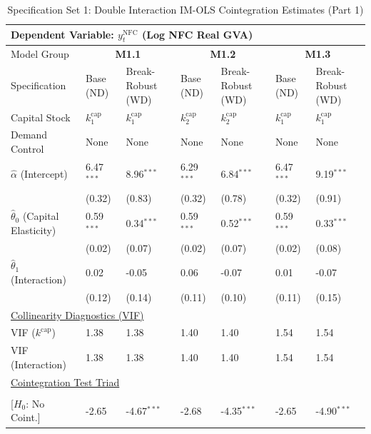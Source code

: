 \begin{table}[H]
\centering
\caption{Specification Set 1: Double Interaction IM-OLS Cointegration Estimates (Part 1)}
\label{tab:spec_set_1_p1}
\scriptsize
\begin{tabular}{p{3.8cm}p{2.1cm}p{2.1cm}p{2.1cm}p{2.1cm}p{2.1cm}p{2.1cm}}
\toprule
\multicolumn{7}{l}{\textbf{Dependent Variable: $y_t^{\text{NFC}}$ (Log NFC Real GVA)}} \\
\midrule
Model Group & \multicolumn{2}{c}{\textbf{M1.1}} & \multicolumn{2}{c}{\textbf{M1.2}} & \multicolumn{2}{c}{\textbf{M1.3}}  \\
Specification & Base (ND) & Break-Robust (WD) & Base (ND) & Break-Robust (WD) & Base (ND) & Break-Robust (WD)  \\
Capital Stock & $k^{\text{cap}}_1$ & $k^{\text{cap}}_1$ & $k^{\text{cap}}_2$ & $k^{\text{cap}}_2$ & $k^{\text{cap}}_1$ & $k^{\text{cap}}_1$  \\
Demand Control & None & None & None & None & None & None  \\
\midrule
$\hat{\alpha}$ (Intercept)  & 6.47$^{***}$ & 8.96$^{***}$ & 6.29$^{***}$ & 6.84$^{***}$ & 6.47$^{***}$ & 9.19$^{***}$  \\
 & {\scriptsize (0.32)} & {\scriptsize (0.83)} & {\scriptsize (0.32)} & {\scriptsize (0.78)} & {\scriptsize (0.32)} & {\scriptsize (0.91)}  \\
[1ex]
$\hat{\theta}_0$ (Capital Elasticity)  & 0.59$^{***}$ & 0.34$^{***}$ & 0.59$^{***}$ & 0.52$^{***}$ & 0.59$^{***}$ & 0.33$^{***}$  \\
 & {\scriptsize (0.02)} & {\scriptsize (0.07)} & {\scriptsize (0.02)} & {\scriptsize (0.07)} & {\scriptsize (0.02)} & {\scriptsize (0.08)}  \\
$\hat{\theta}_1$ (Interaction)  & 0.02 & -0.05 & 0.06 & -0.07 & 0.01 & -0.07  \\
 & {\scriptsize (0.12)} & {\scriptsize (0.14)} & {\scriptsize (0.11)} & {\scriptsize (0.10)} & {\scriptsize (0.11)} & {\scriptsize (0.15)}  \\
\midrule
\multicolumn{7}{l}{\underline{Collinearity Diagnostics (VIF)}} \\
VIF ($k^{\text{cap}}$) & 1.38 & 1.38 & 1.40 & 1.40 & 1.54 & 1.54  \\
VIF (Interaction) & 1.38 & 1.38 & 1.40 & 1.40 & 1.54 & 1.54  \\
\midrule
\multicolumn{7}{l}{\underline{Cointegration Test Triad}} \\
\makecell[l]{Resid. ADF ($t_{\text{ADF}}$) \\ {\scriptsize [$H_0$: No Coint.]}} & -2.65 & -4.67$^{***}$ & -2.68 & -4.35$^{***}$ & -2.65 & -4.90$^{***}$  \\

\end{tabular}
\end{table}
